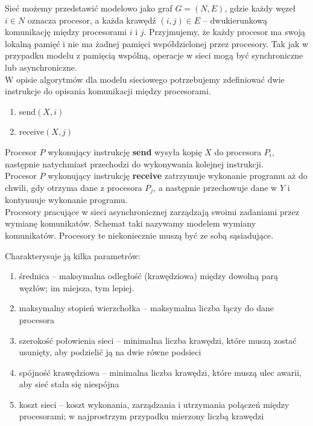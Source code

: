 Sieć możemy przedstawić modelowo jako graf \(G=(N,E)\), gdzie każdy węzeł \(i\in N\) oznacza procesor, a każda krawędź \((i, j) \in E\) – dwukierunkową komunikację między procesorami \(i\) i \(j\). Przyjmujemy, że każdy procesor ma swoją lokalną pamięć i nie ma żadnej pamięci współdzielonej przez procesory. Tak jak w przypadku modelu z pamięcią wspólną, operacje w sieci mogą być synchroniczne lub asynchroniczne.\\

W opisie algorytmów dla modelu sieciowego potrzebujemy zdefiniować dwie instrukcje do opisania komunikacji między procesorami.
\begin{enumerate}
 \item send\((X,i)\)
 \item receive\((X,j)\)
\end{enumerate}

Procesor \(P\) wykonujący instrukcję \textbf{send} wysyła kopię \(X\) do procesora \(P_i\), następnie natychmiast przechodzi do wykonywania kolejnej instrukcji.\\
Procesor \(P\) wykonujący instrukcję \textbf{receive} zatrzymuje wykonanie programu aż do chwili, gdy otrzyma dane z procesora \(P_j\), a następnie przechowuje dane w \(Y\) i kontynuuje wykonanie programu.\\


Procesory pracujące w sieci asynchronicznej zarządzają swoimi zadaniami przez wymianę komunikatów. Schemat taki nazywamy modelem wymiany komunikatów. Procesory te niekoniecznie muszą być ze sobą sąsiadujące. 


Charakterysuje ją kilka parametrów:

\begin{enumerate}
 \item średnica – maksymalna odległość (krawędziowa) między dowolną parą węzłów; im miejsza, tym lepiej.
 \item maksymalny stopień wierzchołka – maksymalna liczba łączy do dane procesora
 \item szerokość połowienia sieci – minimalna liczba krawędzi, które muszą zostać usunięty, aby podzielić ją na dwie równe podsieci
 \item spójność krawędziowa – minimalna liczba krawędzi, które muszą ulec awarii, aby sieć stała się niespójna
 \item koszt sieci – koszt wykonania, zarządzania i utrzymania połączeń między procesorami; w najprostrzym przypadku mierzony liczbą krawędzi
\end{enumerate}


